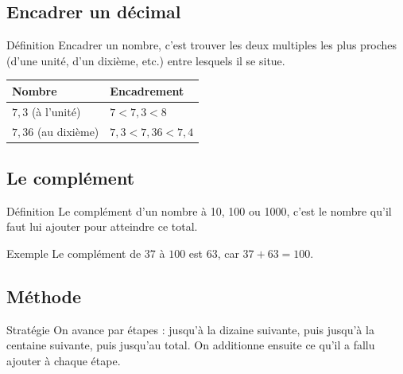 \subsection{Encadrer un décimal}

\begin{regle}{Définition}
Encadrer un nombre, c'est trouver les deux multiples les plus proches (d'une unité, d'un dixième, etc.) entre lesquels il se situe.
\end{regle}

\vspace{6pt}
\def\arraystretch{1.2}
\begin{tabularx}{\linewidth}{|X|X|}
\hline
\cellcolor{themeNO!30}\textbf{Nombre} & \cellcolor{themeNO!30}\textbf{Encadrement} \\\hline
$7,3$ (à l'unité) & $7 < 7,3 < 8$ \\\hline
$7,36$ (au dixième) & $7,3 < 7,36 < 7,4$ \\\hline
\end{tabularx}
\def\arraystretch{1}

\newpage
\semaineinvisible
{} 

\vfill
\subsection{Le complément}

\begin{regle}{Définition}
Le \textcolor{themeColor}{complément} d'un nombre à 10, 100 ou 1000, c'est le nombre qu'il faut lui ajouter pour atteindre ce total.
\end{regle}

\vspace{6pt}
\begin{astuce}{Exemple}
Le complément de $37$ à $100$ est $63$, car $37 + 63 = 100$.
\end{astuce}

\subsection{Méthode}

\begin{astuce}{Stratégie}
On avance par étapes : jusqu'à la dizaine suivante, puis jusqu'à la centaine suivante, puis jusqu'au total. On additionne ensuite ce qu'il a fallu ajouter à chaque étape.
\end{astuce}

